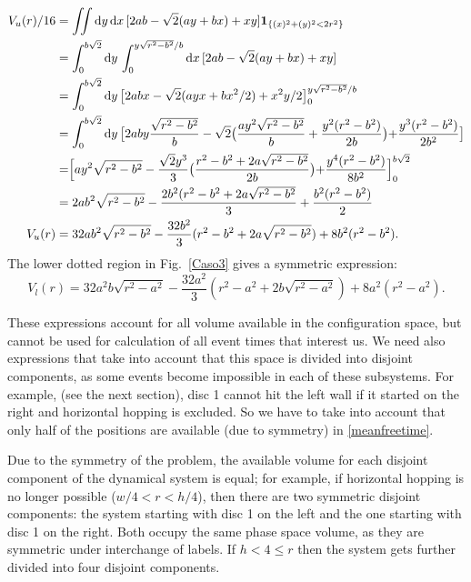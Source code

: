 \documentclass[superscriptaddress,pre,reprint,showpacs,twocolumn]{revtex4-1}
\newcommand{\rd}[1]{\mathrm{d}{#1} \,}
\newcommand{\indicatorsymbol}{\mathbf{1}}
\newcommand{\indicator}[1]{\indicatorsymbol_{ \{   #1 \} } }
\begin{document}
\begin{widetext}
\begin{equation} \label{app:voldot}
  \begin{split}
    V_{u}(r) /16 &=\iint \rd y \rd x [2ab-\sqrt{2}(ay+bx)+xy] \indicator{(x)^2+(y)^2<2r^2 }\\
    &=\int_0^{b\sqrt{2}}\rd y \int_{0}^{y\sqrt{r^2-b^2}/b} \rd x [2ab-\sqrt{2}(ay+bx)+xy] \\
   &=\int_0^{b\sqrt{2}}\rd y \bigl[2abx-\sqrt{2}(ayx+bx^2/2)+x^2y/2\bigr]_{0}^{y\sqrt{r^2-b^2}/b} \\
      &=\int_0^{b\sqrt{2}}\rd y
        \bigr[
          2aby\frac{\sqrt{r^2-b^2}}{b}
          -\sqrt{2}
          \bigr(
          \frac{ay^2\sqrt{r^2-b^2}}{b}
            +\frac{y^2(r^2-b^2)}{2b}
            \bigl)
           +\frac{y^3(r^2-b^2)}{2b^2}
           \bigl]\\
        &= \Bigr[ay^2\sqrt{r^2-b^2}-
          \frac{\sqrt{2}y^3}{3}
          \bigr(
          \frac{r^2-b^2+2a\sqrt{r^2-b^2}}{2b}
            \bigl)
            +\frac{y^4(r^2-b^2)}{8b^2}
            \Bigl]_0^{b\sqrt{2}}\\
          &=2ab^2\sqrt{r^2-b^2}
          -\frac{2b^2(r^2-b^2+2a\sqrt{r^2-b^2}}{3}+\frac{b^2(r^2-b^2)}{2}\\
          V_{u}(r)&=32ab^2\sqrt{r^2-b^2} -\frac{32
            b^2}{3}(r^2-b^2+2a\sqrt{r^2-b^2}) +8b^2(r^2-b^2).
  \end{split}
  \end{equation}
The lower dotted  region in Fig.~\ref{Caso3} gives a symmetric expression:
\begin{equation}
          V_{l}(r)=32a^2b\sqrt{r^2-a^2} -\frac{32
            a^2}{3}(r^2-a^2+2b\sqrt{r^2-a^2}) +8a^2(r^2-a^2).
\end{equation}
\end{widetext}

These expressions account for all volume available in the configuration space, but
cannot be used for calculation of all event times that interest us. We need also
expressions that take into account that this space is divided into disjoint components,
as some events become impossible in each of these subsystems. For example,
(see the next section), disc 1 cannot hit the left wall if
it started on the right and horizontal hopping is excluded. So we have to
take into account that only half of the positions are available (due to symmetry)
 in \eqref{meanfreetime}.

Due to the symmetry of the problem, the available volume
for each disjoint component of the dynamical system is equal; for example, if horizontal hopping is no longer possible
($w/4<r<h/4$), then there are two symmetric disjoint components: the system
starting with disc 1 on the left and the one starting with disc 1 on
the right. Both occupy the same phase space volume, as they are
symmetric under interchange of labels. If $h<4\leq r$ then the system gets further
divided into four disjoint components. 
\end{document}
